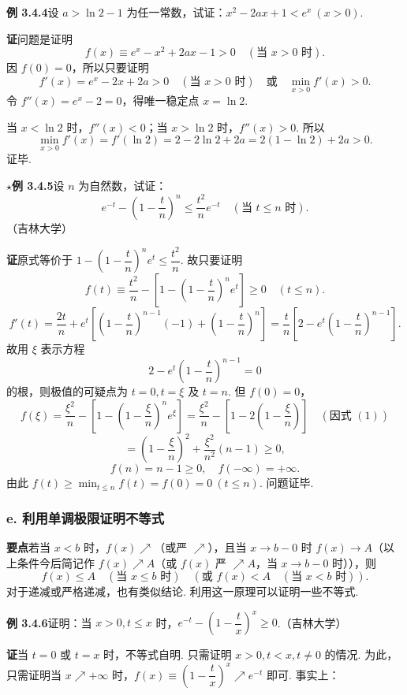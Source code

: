 \documentclass[UTF8,12pt,a4paper,fontset=fandol]{ctexart}
\begin{document}
\noindent\textbf{例 3.4.4}\quad 设 $a>\ln2-1$ 为任一常数，试证：$x^2-2ax+1<e^x\ (x>0)$.

\noindent\textbf{证}\quad 问题是证明
\[
  f(x)\equiv e^x-x^2+2ax-1>0\quad(\text{当 }x>0\text{ 时}).
\]
因 $f(0)=0$，所以只要证明
\[
  f'(x)=e^x-2x+2a>0\quad(\text{当 }x>0\text{ 时})
  \quad\text{或}\quad \min_{x>0}f'(x)>0.
\]
令 $f''(x)=e^x-2=0$，得唯一稳定点 $x=\ln2$.

当 $x<\ln2$ 时，$f''(x)<0$；当 $x>\ln2$ 时，$f''(x)>0$. 所以
\[
  \min_{x>0}f'(x)=f'(\ln2)=2-2\ln2+2a=2(1-\ln2)+2a>0.
\]
证毕.

\noindent\textbf{$\star$例 3.4.5}\quad 设 $n$ 为自然数，试证：
\[
  e^{-t}-\left(1-\frac tn\right)^n\le \frac{t^2}{n}e^{-t}\quad(\text{当 }t\le n\text{ 时}).
\]
（吉林大学）

\noindent\textbf{证}\quad 原式等价于 $1-\left(1-\dfrac tn\right)^n e^t\le \dfrac{t^2}{n}$. 故只要证明
\[
  f(t)\equiv \frac{t^2}{n}-\left[1-\left(1-\frac tn\right)^n e^t\right]\ge0\quad(t\le n).
\]
\[
  f'(t)=\frac{2t}{n}+e^t\left[\left(1-\frac tn\right)^{n-1}(-1)+\left(1-\frac tn\right)^n\right]
  =\frac tn\left[2-e^t\left(1-\frac tn\right)^{n-1}\right].
\]
故用 $\xi$ 表示方程
\[
  2-e^t\left(1-\frac tn\right)^{n-1}=0 \tag{1}
\]
的根，则极值的可疑点为 $t=0,t=\xi$ 及 $t=n$. 但 $f(0)=0$，
\[
  f(\xi)=\frac{\xi^2}{n}-\left[1-\left(1-\frac{\xi}{n}\right)^n e^\xi\right]
  =\frac{\xi^2}{n}-\left[1-2\left(1-\frac{\xi}{n}\right)\right]\quad(\text{因式 }(1))
\]
\[
  =\left(1-\frac{\xi}{n}\right)^2+\frac{\xi^2}{n^2}(n-1)\ge0,
\]
\[
  f(n)=n-1\ge0,\quad f(-\infty)=+\infty.
\]
由此 $f(t)\ge \min_{t\le n}f(t)=f(0)=0\ (t\le n)$. 问题证毕.

\subsubsection*{e. 利用单调极限证明不等式}

\noindent\textbf{要点}\quad 若当 $x<b$ 时，$f(x)\nearrow$（或严 $\nearrow$），且当 $x\to b-0$ 时 $f(x)\to A$（以上条件今后简记作 $f(x)\nearrow A$（或 $f(x)$ 严 $\nearrow A$，当 $x\to b-0$ 时）），则
\[
  f(x)\le A\quad(\text{当 }x\le b\text{ 时})\quad
  (\text{或 }f(x)<A\quad(\text{当 }x<b\text{ 时})).
\]
对于递减或严格递减，也有类似结论. 利用这一原理可以证明一些不等式.

\noindent\textbf{例 3.4.6}\quad 证明：当 $x>0,t\le x$ 时，$e^{-t}-\left(1-\dfrac tx\right)^x\ge0$.（吉林大学）

\noindent\textbf{证}\quad 当 $t=0$ 或 $t=x$ 时，不等式自明. 只需证明 $x>0,t<x,t\ne0$ 的情况. 为此，只需证明当 $x\nearrow+\infty$ 时，$f(x)\equiv\left(1-\dfrac tx\right)^x\nearrow e^{-t}$ 即可. 事实上：
\end{document}
